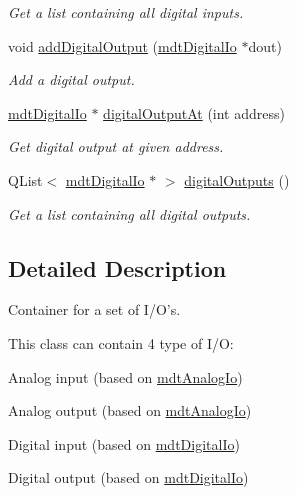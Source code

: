 \begin{DoxyCompactItemize}
\begin{DoxyCompactList}\small\item\em Get a list containing all digital inputs. \end{DoxyCompactList}\item 
void \hyperlink{classmdt_device_ios_af1f41d3c60f1030fb303436820417d14}{addDigitalOutput} (\hyperlink{classmdt_digital_io}{mdtDigitalIo} $\ast$dout)
\begin{DoxyCompactList}\small\item\em Add a digital output. \end{DoxyCompactList}\item 
\hyperlink{classmdt_digital_io}{mdtDigitalIo} $\ast$ \hyperlink{classmdt_device_ios_ac2fed299f5ba1884c01adde195c5b007}{digitalOutputAt} (int address)
\begin{DoxyCompactList}\small\item\em Get digital output at given address. \end{DoxyCompactList}\item 
\hypertarget{classmdt_device_ios_a8a72f1844f794d4b5cb7bfede8bcef99}{
QList$<$ \hyperlink{classmdt_digital_io}{mdtDigitalIo} $\ast$ $>$ \hyperlink{classmdt_device_ios_a8a72f1844f794d4b5cb7bfede8bcef99}{digitalOutputs} ()}
\label{classmdt_device_ios_a8a72f1844f794d4b5cb7bfede8bcef99}

\begin{DoxyCompactList}\small\item\em Get a list containing all digital outputs. \end{DoxyCompactList}\end{DoxyCompactItemize}


\subsection{Detailed Description}
Container for a set of I/O's. 

This class can contain 4 type of I/O:
\begin{DoxyItemize}
\item Analog input (based on \hyperlink{classmdt_analog_io}{mdtAnalogIo})
\item Analog output (based on \hyperlink{classmdt_analog_io}{mdtAnalogIo})
\item Digital input (based on \hyperlink{classmdt_digital_io}{mdtDigitalIo})
\item Digital output (based on \hyperlink{classmdt_digital_io}{mdtDigitalIo})
\end{DoxyItemize}

